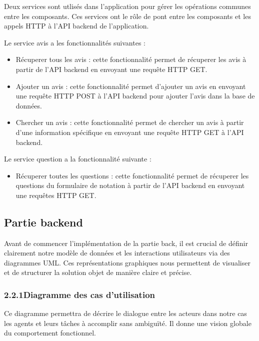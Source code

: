     Deux services sont utlisés dans l'application pour gérer les opérations communes entre les composants.  Ces services ont le rôle de pont entre les composants et les appels HTTP à l'API backend de l'application.    
    \medskip

    Le service avis a les fonctionnalités suivantes :
    \medskip
    
    \begin{itemize}
        \item Récuperer tous les avis : cette fonctionnalité permet de récuperer les avis à partir de l'API backend en envoyant une requête HTTP GET.
        \item Ajouter un avis : cette fonctionnalité permet d'ajouter un avis en envoyant une requête HTTP POST à l'API backend pour ajouter l'avis dans la base de données.
        \item Chercher un avis : cette fonctionnalité permet de chercher un avis à partir d'une information spécifique en envoyant une requête HTTP GET à l'API backend.
    \end{itemize}
    \medskip

    Le service question a la fonctionnalité suivante :\medskip
    \begin{itemize}
        \item Récuperer toutes les questions : cette fonctionnalité permet de récuperer les questions du formulaire de notation à partir de l'API backend en envoyant une requêtes HTTP GET.
    \end{itemize}\medskip
    
    \subsection{Partie backend}
    Avant de commencer l'implémentation de la partie back, il est crucial de définir clairement notre modèle de données et les interactions utilisateurs via des diagrammes UML. Ces représentations graphiques nous permettent de visualiser et de structurer la solution objet de manière claire et précise. 
    \medskip
    \subsubsection{2.2.1\hspace{2em}Diagramme des cas d'utilisation}
        Ce diagramme permettra de décrire le dialogue entre les acteurs dans notre cas les agents et leurs tâches à accomplir sans ambiguïté. Il donne une vision globale du comportement fonctionnel.
        \medskip

